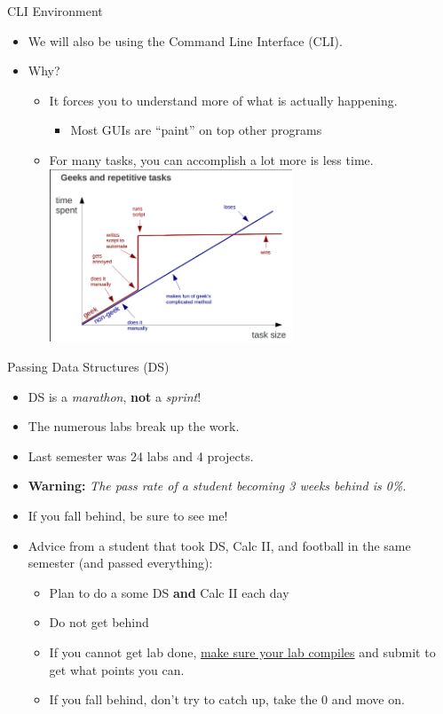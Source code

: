 \documentclass{beamer}
\begin{document}
\begin{frame}{CLI Environment}
\begin{itemize}
\item We will also be using the Command Line Interface (CLI).
\item Why?
\begin{itemize}
\item It forces you to understand more of what is actually happening.
\begin{itemize}
\item Most GUIs are ``paint'' on top other programs
\end{itemize}
\item For many tasks, you can accomplish a lot more is less time. \\
\includegraphics[width=0.6\textwidth]{../imgs/cli-vs-gui.png}
\end{itemize}
\end{itemize}
\end{frame}

\begin{frame}{Passing Data Structures (DS)}
\begin{itemize}
\item DS is a \textit{marathon}, \textbf{not} a \textit{sprint}!
\item The numerous labs break up the work.
\item Last semester was 24 labs and 4 projects.
\item \textbf{Warning:} \textit{The pass rate of a student becoming 3 weeks behind is 0\%}.
\item If you fall behind, be sure to see me!
\item Advice from a student that took DS, Calc II, and football in the same semester (and passed everything):
\begin{itemize}
\item Plan to do a some DS \textbf{and} Calc II each day
\item Do not get behind
\item If you cannot get lab done, \underline{make sure your lab compiles} and submit to get what points you can.
\item If you fall behind, don't try to catch up, take the 0 and move on.
\end{itemize}
\end{itemize}
\end{frame}
\end{document}
